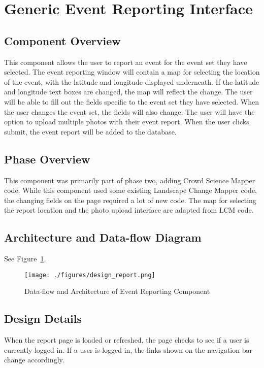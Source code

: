 \section{Generic Event Reporting Interface}

\subsection{Component  Overview}
This component allows the user to report an event for the event set they have selected. The event reporting window will contain a map for selecting the location of the event, with the latitude and longitude displayed underneath. If the latitude and longitude text boxes are changed, the map will reflect the change. The user will be able to fill out the fields specific to the event set they have selected. When the user changes the event set, the fields will also change. The user will have the option to upload multiple photos with their event report. When the user clicks submit, the event report will be added to the database.

\subsection{Phase Overview}
This component was primarily part of phase two, adding Crowd Science Mapper code. While this component used some existing Landscape Change Mapper code, the changing fields on the page required a lot of new code. The map for selecting the report location and the photo upload interface are adapted from LCM code.

\subsection{ Architecture and Data-flow Diagram}
See Figure~\ref{design_report}.
\begin{figure}[tbh]
\begin{center}
\texttt{[image: ./figures/design\_report.png]}
\end{center}
\caption{Data-flow and Architecture of Event Reporting Component \label{design_report}}
\end{figure} 

\subsection{Design Details}
When the report page is loaded or refreshed, the page checks to see if a user is currently logged in. If a user is logged in, the links shown on the navigation bar change accordingly. 

